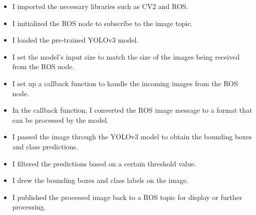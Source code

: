 \documentclass[11pt, a4paper, openany]{book}
\begin{document}
\begin{itemize}
    \item I imported the necessary libraries such as CV2 and ROS.
  \item I initialized the ROS node to subscribe to the image topic.
  \item I loaded the pre-trained YOLOv3 model.
  \item I set the model's input size to match the size of the images being received from the ROS node.
  \item I set up a callback function to handle the incoming images from the ROS node.
  \item In the callback function, I converted the ROS image message to a format that can be processed by the model.
  \item I passed the image through the YOLOv3 model to obtain the bounding boxes and class predictions.
  \item I filtered the predictions based on a certain threshold value.
  \item I drew the bounding boxes and class labels on the image.
  \item I published the processed image back to a ROS topic for display or further processing.\cite{Github}
\end{itemize}
\end{document}
